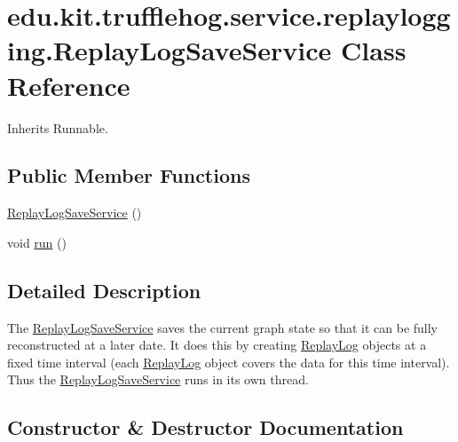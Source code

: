 \hypertarget{classedu_1_1kit_1_1trufflehog_1_1service_1_1replaylogging_1_1_replay_log_save_service}{}\section{edu.\+kit.\+trufflehog.\+service.\+replaylogging.\+Replay\+Log\+Save\+Service Class Reference}
\label{classedu_1_1kit_1_1trufflehog_1_1service_1_1replaylogging_1_1_replay_log_save_service}


Inherits Runnable.

\subsection*{Public Member Functions}
\begin{DoxyCompactItemize}
\item 
\hyperlink{classedu_1_1kit_1_1trufflehog_1_1service_1_1replaylogging_1_1_replay_log_save_service_a6c679cb4574f24f914e3c0402d444d40}{Replay\+Log\+Save\+Service} ()
\item 
void \hyperlink{classedu_1_1kit_1_1trufflehog_1_1service_1_1replaylogging_1_1_replay_log_save_service_ae78e77d574e2e7f8791152f03e2f350a}{run} ()
\end{DoxyCompactItemize}


\subsection{Detailed Description}
The \hyperlink{classedu_1_1kit_1_1trufflehog_1_1service_1_1replaylogging_1_1_replay_log_save_service}{Replay\+Log\+Save\+Service} saves the current graph state so that it can be fully reconstructed at a later date. It does this by creating \hyperlink{classedu_1_1kit_1_1trufflehog_1_1service_1_1replaylogging_1_1_replay_log}{Replay\+Log} objects at a fixed time interval (each \hyperlink{classedu_1_1kit_1_1trufflehog_1_1service_1_1replaylogging_1_1_replay_log}{Replay\+Log} object covers the data for this time interval). Thus the \hyperlink{classedu_1_1kit_1_1trufflehog_1_1service_1_1replaylogging_1_1_replay_log_save_service}{Replay\+Log\+Save\+Service} runs in its own thread. 

\subsection{Constructor \& Destructor Documentation}
\hypertarget{classedu_1_1kit_1_1trufflehog_1_1service_1_1replaylogging_1_1_replay_log_save_service_a6c679cb4574f24f914e3c0402d444d40}{}
